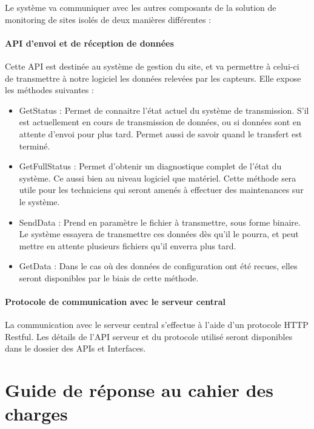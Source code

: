 Le système va communiquer avec les autres composants de la solution de monitoring de sites isolés de deux manières différentes :

\paragraph{API d'envoi et de réception de données}

Cette API est destinée au système de gestion du site, et va permettre à celui-ci de transmettre à notre logiciel les données relevées par les capteurs. Elle expose les méthodes suivantes :

\begin{itemize}
\item GetStatus : Permet de connaitre l'état actuel du système de transmission. S'il est actuellement en cours de transmission de données, ou si données sont en attente d'envoi pour plus tard. Permet aussi de savoir quand le transfert est terminé.
\item GetFullStatus : Permet d'obtenir un diagnostique complet de l'état du système. Ce aussi bien au niveau logiciel que matériel. Cette méthode sera utile pour les techniciens qui seront amenés à effectuer des maintenances sur le système.
\item SendData : Prend en paramètre le fichier à transmettre, sous forme binaire. Le système essayera de transmettre ces données dès qu'il le pourra, et peut mettre en attente plusieurs fichiers qu'il enverra plus tard.
\item GetData : Dans le cas où des données de configuration ont été recues, elles seront disponibles par le biais de cette méthode.
\end{itemize}

\paragraph{Protocole de communication avec le serveur central}

La communication avec le serveur central s'effectue à l'aide d'un protocole HTTP Restful\footnotemark. Les détails de l'API serveur et du protocole utilisé seront disponibles dans le dossier des APIs et Interfaces.


\section{Guide de réponse au cahier des charges}

